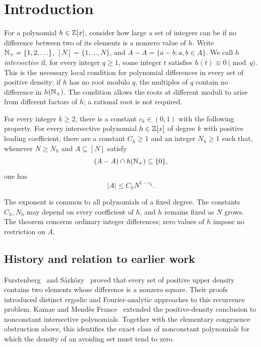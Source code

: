 \section{Introduction}\label{sec:introduction}

For a polynomial $h\in\mathbb Z[x]$, consider how large a set of integers can be
if no difference between two of its elements is a nonzero value of $h$.
Write $\mathbb N_+=\{1,2,\ldots\}$, $[N]=\{1,\ldots,N\}$, and
$A-A=\{a-b:a,b\in A\}$. We call $h$ \emph{intersective} if, for every
integer $q\ge1$, some integer $t$ satisfies $h(t)\equiv0\pmod q$.
This is the necessary local condition for polynomial differences in every
set of positive density: if $h$ has no root modulo $q$, the multiples of
$q$ contain no difference in $h(\mathbb N_+)$. The condition allows the roots at
different moduli to arise from different factors of $h$; a rational root is
not required.

\begin{theorem}\label{thm:main}
For every integer $k\ge2$, there is a constant $c_k\in(0,1)$ with the
following property. For every intersective polynomial $h\in\mathbb Z[x]$ of degree
$k$ with positive leading coefficient, there are a constant $C_h\ge1$ and an
integer $N_h\ge1$ such that, whenever $N\ge N_h$ and $A\subseteq[N]$ satisfy
\[
 (A-A)\cap h(\mathbb N_+)\subseteq\{0\},
\]
one has
\[
 |A|\le C_h N^{1-c_k}.
\]
\end{theorem}

The exponent is common to all polynomials of a fixed degree. The constants
$C_h,N_h$ may depend on every coefficient of $h$, and $h$ remains fixed as
$N$ grows. The theorem concerns ordinary integer differences; zero values of
$h$ impose no restriction on $A$.

\subsection{History and relation to earlier work}

Furstenberg~\cite{Furstenberg1977} and S\'ark\"ozy~\cite{Sarkozy1978}
proved that every set of positive upper density contains two elements
whose difference is a nonzero square. Their proofs introduced distinct
ergodic and Fourier-analytic approaches to this recurrence problem.
Kamae and Mend\`es France~\cite{KamaeMendesFrance1978} extended the
positive-density conclusion to nonconstant intersective polynomials. Together with
the elementary congruence obstruction above, this identifies the exact
class of nonconstant polynomials for which the density of an avoiding set must tend
to zero.

